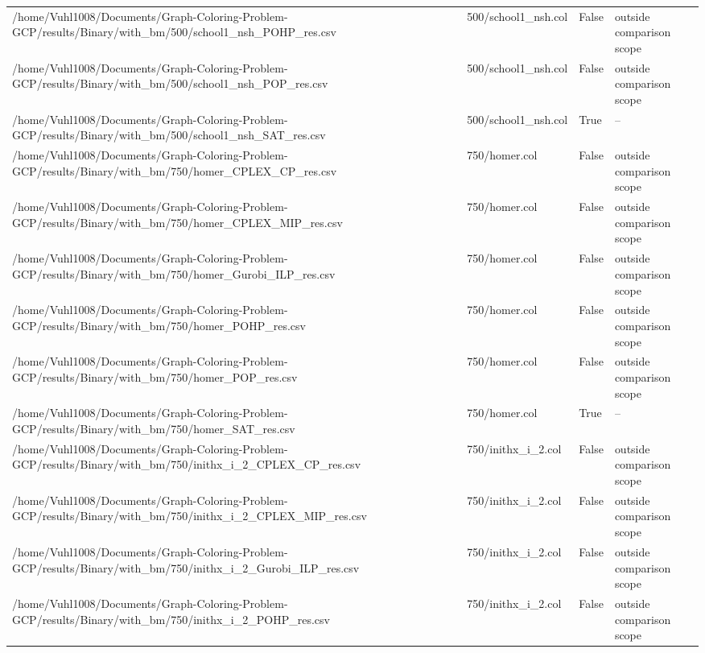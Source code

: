 \begin{table}[htbp]
\begin{tabular}{llll}
/home/Vuhl1008/Documents/Graph-Coloring-Problem-GCP/results/Binary/with\_bm/500/school1\_nsh\_POHP\_res.csv & 500/school1\_nsh.col & False & outside comparison scope \\
/home/Vuhl1008/Documents/Graph-Coloring-Problem-GCP/results/Binary/with\_bm/500/school1\_nsh\_POP\_res.csv & 500/school1\_nsh.col & False & outside comparison scope \\
/home/Vuhl1008/Documents/Graph-Coloring-Problem-GCP/results/Binary/with\_bm/500/school1\_nsh\_SAT\_res.csv & 500/school1\_nsh.col & True & -- \\
/home/Vuhl1008/Documents/Graph-Coloring-Problem-GCP/results/Binary/with\_bm/750/homer\_CPLEX\_CP\_res.csv & 750/homer.col & False & outside comparison scope \\
/home/Vuhl1008/Documents/Graph-Coloring-Problem-GCP/results/Binary/with\_bm/750/homer\_CPLEX\_MIP\_res.csv & 750/homer.col & False & outside comparison scope \\
/home/Vuhl1008/Documents/Graph-Coloring-Problem-GCP/results/Binary/with\_bm/750/homer\_Gurobi\_ILP\_res.csv & 750/homer.col & False & outside comparison scope \\
/home/Vuhl1008/Documents/Graph-Coloring-Problem-GCP/results/Binary/with\_bm/750/homer\_POHP\_res.csv & 750/homer.col & False & outside comparison scope \\
/home/Vuhl1008/Documents/Graph-Coloring-Problem-GCP/results/Binary/with\_bm/750/homer\_POP\_res.csv & 750/homer.col & False & outside comparison scope \\
/home/Vuhl1008/Documents/Graph-Coloring-Problem-GCP/results/Binary/with\_bm/750/homer\_SAT\_res.csv & 750/homer.col & True & -- \\
/home/Vuhl1008/Documents/Graph-Coloring-Problem-GCP/results/Binary/with\_bm/750/inithx\_i\_2\_CPLEX\_CP\_res.csv & 750/inithx\_i\_2.col & False & outside comparison scope \\
/home/Vuhl1008/Documents/Graph-Coloring-Problem-GCP/results/Binary/with\_bm/750/inithx\_i\_2\_CPLEX\_MIP\_res.csv & 750/inithx\_i\_2.col & False & outside comparison scope \\
/home/Vuhl1008/Documents/Graph-Coloring-Problem-GCP/results/Binary/with\_bm/750/inithx\_i\_2\_Gurobi\_ILP\_res.csv & 750/inithx\_i\_2.col & False & outside comparison scope \\
/home/Vuhl1008/Documents/Graph-Coloring-Problem-GCP/results/Binary/with\_bm/750/inithx\_i\_2\_POHP\_res.csv & 750/inithx\_i\_2.col & False & outside comparison scope \\

\end{tabular}
\end{table}
